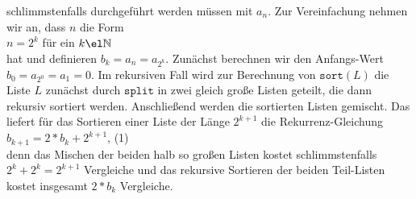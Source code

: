 schlimmstenfalls durchgef\"uhrt werden m\"ussen mit $a_n$.  Zur Vereinfachung nehmen wir an, dass $n$ die Form \\[0.1cm]
\hspace*{1.3cm} $\displaystyle n = 2^k$ \qquad f\"ur ein $k \el \mathbb{N}$ \\[0.1cm]
hat und definieren $b_k = a_n = a_{2^k}$.  Zun\"achst berechnen wir den Anfangs-Wert
$\displaystyle b_0 = a_{2^0} = a_1 = 0$.  Im rekursiven Fall wird zur Berechnung
von $\mathtt{sort}(L)$ die Liste $L$ zun\"achst durch $\texttt{split}$ in zwei
gleich gro{\ss}e Listen geteilt, die dann rekursiv sortiert werden. Anschlie{\ss}end
werden die sortierten Listen
gemischt.  Das liefert f\"ur das Sortieren einer Liste der L\"ange $2^{k+1}$ die Rekurrenz-Gleichung \\[0.1cm]
\hspace*{1.3cm} $b_{k+1} = 2 * b_k + 2^{k+1}$, \hspace*{\fill} (1) \\[0.1cm]
denn das Mischen der beiden halb so gro{\ss}en Listen kostet schlimmstenfalls $2^k +
2^k = 2^{k+1}$ Vergleiche und das rekursive Sortieren 
der beiden Teil-Listen
kostet insgesamt $2*b_k$ Vergleiche.

